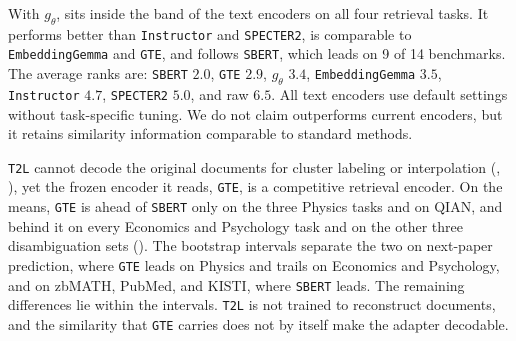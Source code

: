 \begin{table}[t]
\centering
\small
\caption{Similarity benchmarks, absolute scores. Each row is one task on one field or dataset; \emph{raw} is the \doctolora embedding and \emph{adapted} applies $g_\theta$, the linear transform trained on OpenAlex. Text encoders are ordered by mean rank, best first. Cells are the bootstrap mean $\pm$ its standard deviation over $1{,}000$ resamples. The best method in a row is bold and shaded and the second-best underlined. Rows carry different metrics and sit at different levels, so a method is read down a row, never across rows. \texttt{SPECTER} replaces \texttt{SPECTER2} on the disambiguation rows. Full protocol in Appendix~\ref{app:benchmarks}.}
\label{tab:similarity}

\end{table}

With $g_\theta$, \doctolora sits inside the band of the text encoders on all four retrieval tasks. It performs better than \texttt{Instructor} and \texttt{SPECTER2}, is comparable to \texttt{EmbeddingGemma} and \texttt{GTE}, and follows \texttt{SBERT}, which leads on 9 of 14 benchmarks. The average ranks are: \texttt{SBERT} $2.0$, \texttt{GTE} $2.9$, \doctolora{+}$g_\theta$ $3.4$, \texttt{EmbeddingGemma} $3.5$, \texttt{Instructor} $4.7$, \texttt{SPECTER2} $5.0$, and raw \doctolora $6.5$. All text encoders use default settings without task-specific tuning. We do not claim \doctolora outperforms current encoders, but it retains similarity information comparable to standard methods.

\texttt{T2L} cannot decode the original documents for cluster labeling or interpolation (, ), yet the frozen encoder it reads, \texttt{GTE}, is a competitive retrieval encoder. On the means, \texttt{GTE} is ahead of \texttt{SBERT} only on the three Physics tasks and on QIAN, and behind it on every Economics and Psychology task and on the other three disambiguation sets (). The bootstrap intervals separate the two on next-paper prediction, where \texttt{GTE} leads on Physics and trails on Economics and Psychology, and on zbMATH, PubMed, and KISTI, where \texttt{SBERT} leads. The remaining differences lie within the intervals. \texttt{T2L} is not trained to reconstruct documents, and the similarity that \texttt{GTE} carries does not by itself make the adapter decodable.

